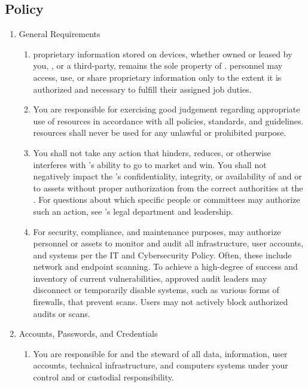\documentclass[../main.tex]{subfiles}
\begin{document}
\subsection{Policy}
\begin{enumerate}
    \item General Requirements
    \begin{enumerate}
        \item \CompanyName{} proprietary information stored on devices, whether owned or leased by you, \CompanyName, or a third-party, remains the sole property of \CompanyName.
        \CompanyName{} personnel may access, use, or share \CompanyName{} proprietary information only to the extent it is authorized and necessary to fulfill their assigned job duties.
        \item You are responsible for exercising good judgement regarding appropriate use of \CompanyName{} resources in accordance with all \CompanyName{} policies, standards, and guidelines.
        \CompanyName{} resources shall never be used for any unlawful or prohibited purpose.
        \item You shall not take any action that hinders, reduces, or otherwise interferes with \CompanyName's ability to go to market and win. You shall not negatively impact
        the \CompanyName's confidentiality, integrity, or availability of and or to assets without proper authorization from the correct authorities at the \CompanyName.
        For questions about which specific people or committees may authorize such an action, see \CompanyName's legal department and \CompanyName{} leadership.
        \item For security, compliance, and maintenance purposes, \CompanyName{} may authorize personnel or assets to monitor and audit all infrastructure, user accounts, and systems per
        the IT and Cybersecurity Policy. Often, these include network and endpoint scanning. To achieve a high-degree of success and inventory of current vulnerabilities, approved audit
        leaders may disconnect or temporarily disable systems, such as various forms of firewalls, that prevent scans. Users may not actively block authorized audits or scans.
    \end{enumerate}
    \item Accounts, Passwords, and Credentials
    \begin{enumerate}
        \item You are responsible for and the steward of all data, information, user accounts, technical infrastructure, and computers systems under your control and or custodial responsibility.

\end{enumerate}
\end{enumerate}
\end{document}
